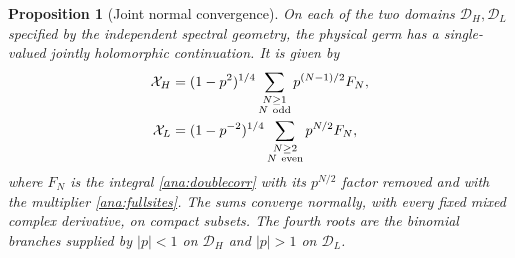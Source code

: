 \documentclass[11pt]{article}
\numberwithin{equation}{section}
\newtheorem{proposition}[theorem]{Proposition}
\theoremstyle{definition}
\renewcommand{\DH}{\mathcal D_H}
\newcommand{\DL}{\mathcal D_L}
\newcommand{\XH}{\mathcal X_H}
\newcommand{\XL}{\mathcal X_L}
\begin{document}
\begin{proposition}[Joint normal convergence]\label{ana:normal}
On each of the two domains \(\DH,\DL\) specified by the independent
spectral geometry, the physical germ has a single-valued jointly
holomorphic continuation. It is given by
\begin{align}
 \XH&=(1-p^2)^{1/4}
       \sum_{\substack{N\ge1\\N\ {\rm odd}}}p^{(N-1)/2}F_N,
       \label{ana:globalHT}\\
 \XL&=(1-p^{-2})^{1/4}
       \sum_{\substack{N\ge2\\N\ {\rm even}}}p^{N/2}F_N,
       \label{ana:globalLT}
\end{align}
where \(F_N\) is the integral \eqref{ana:doublecorr} with its
\(p^{N/2}\) factor removed and with the multiplier
\eqref{ana:fullsites}. The sums converge normally, with every fixed
mixed complex derivative, on compact subsets. The fourth roots are
the binomial branches supplied by \(|p|<1\) on \(\DH\) and
\(|p|>1\) on \(\DL\).
\end{proposition}
\end{document}
